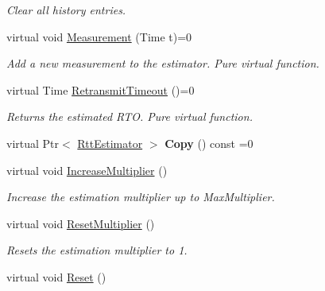 \begin{DoxyCompactItemize}
\begin{DoxyCompactList}\small\item\em Clear all history entries. \end{DoxyCompactList}\item 
virtual void \hyperlink{classns3_1_1ndn_1_1RttEstimator_ad0a023a78ab3412cd3cc115d3e3f20f8}{Measurement} (Time t)=0
\begin{DoxyCompactList}\small\item\em Add a new measurement to the estimator. Pure virtual function. \end{DoxyCompactList}\item 
virtual Time \hyperlink{classns3_1_1ndn_1_1RttEstimator_a2a698a250c27dc78e9fdfcbacf3bfb34}{Retransmit\+Timeout} ()=0
\begin{DoxyCompactList}\small\item\em Returns the estimated R\+TO. Pure virtual function. \end{DoxyCompactList}\item 
virtual Ptr$<$ \hyperlink{classns3_1_1ndn_1_1RttEstimator}{Rtt\+Estimator} $>$ {\bfseries Copy} () const =0\hypertarget{classns3_1_1ndn_1_1RttEstimator_a1826c0ce22c5a72e5b5ba5c4b8513bab}{}\label{classns3_1_1ndn_1_1RttEstimator_a1826c0ce22c5a72e5b5ba5c4b8513bab}

\item 
virtual void \hyperlink{classns3_1_1ndn_1_1RttEstimator_ab13362dd70be76778cf6ed7768a3c5ac}{Increase\+Multiplier} ()\hypertarget{classns3_1_1ndn_1_1RttEstimator_ab13362dd70be76778cf6ed7768a3c5ac}{}\label{classns3_1_1ndn_1_1RttEstimator_ab13362dd70be76778cf6ed7768a3c5ac}

\begin{DoxyCompactList}\small\item\em Increase the estimation multiplier up to Max\+Multiplier. \end{DoxyCompactList}\item 
virtual void \hyperlink{classns3_1_1ndn_1_1RttEstimator_a3e791c0e292b0694798ca2590dc57bef}{Reset\+Multiplier} ()\hypertarget{classns3_1_1ndn_1_1RttEstimator_a3e791c0e292b0694798ca2590dc57bef}{}\label{classns3_1_1ndn_1_1RttEstimator_a3e791c0e292b0694798ca2590dc57bef}

\begin{DoxyCompactList}\small\item\em Resets the estimation multiplier to 1. \end{DoxyCompactList}\item 
virtual void \hyperlink{classns3_1_1ndn_1_1RttEstimator_ad67208872e6bf804be2c1b2c3f1da46a}{Reset} ()\hypertarget{classns3_1_1ndn_1_1RttEstimator_ad67208872e6bf804be2c1b2c3f1da46a}{}\label{classns3_1_1ndn_1_1RttEstimator_ad67208872e6bf804be2c1b2c3f1da46a}


\end{DoxyCompactItemize}
